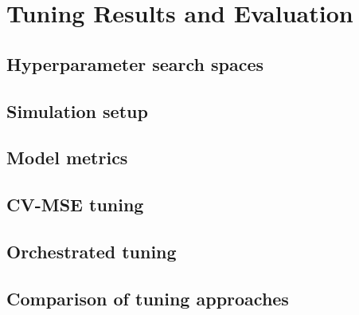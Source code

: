 \chapter{Tuning Results and Evaluation}

\section{Hyperparameter search spaces}


\section{Simulation setup}

\section{Model metrics}

\section{CV-MSE tuning}


\section{Orchestrated tuning}


\section{Comparison of tuning approaches}


